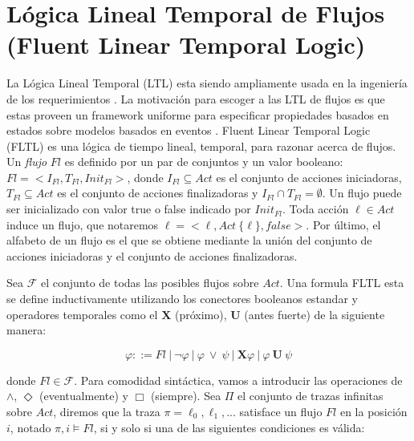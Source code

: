 \section{Lógica Lineal Temporal de Flujos (Fluent Linear Temporal Logic)}

La Lógica Lineal Temporal (LTL) esta siendo ampliamente usada en la ingeniería de los requerimientos
\cite{1347546,Giannakopoulou:2003:FMC:940071.940106,879820,Letier:2002:ATG:581339.581353}. La motivación para escoger a
las LTL de flujos es que estas proveen un framework uniforme para especificar propiedades basados en estados sobre
modelos basados en eventos \cite{Giannakopoulou:2003:FMC:940071.940106}. Fluent Linear Temporal Logic (FLTL) \cite{Giannakopoulou:2003:FMC:940071.940106}
es una lógica de tiempo lineal, temporal, para razonar acerca de flujos. Un \emph{flujo} $Fl$ es definido por un par de
conjuntos y un valor booleano: $Fl = <I_{Fl},T_{Fl},Init_{Fl}>$, donde $I_{Fl} \subseteq Act$ es el conjunto de acciones
iniciadoras, $T_{Fl} \subseteq Act$ es el conjunto de acciones finalizadoras y $I_{Fl} \cap T_{Fl} = \emptyset$. Un
flujo puede ser inicializado con valor true o false indicado por $Init_{Fl}$. Toda acción $\ell \in Act$ induce un flujo,
que notaremos $\ell = <\ell, Act \ \{\ell\}, false>$. Por último, el alfabeto de un flujo es el que se obtiene mediante la
unión del conjunto de acciones iniciadoras y el conjunto de acciones finalizadoras.

Sea $\mathcal{F}$ el conjunto de todas las posibles flujos sobre $Act$. Una formula FLTL esta se define inductivamente
utilizando los conectores booleanos estandar y operadores temporales como el $\mathbf{X}$ (próximo), $\mathbf{U}$ (antes
fuerte) de la
siguiente manera:

\begin{center}
\begin{equation*}
    \varphi ::= Fl\ |\ \neg\varphi\ |\ \varphi\ \lor\ \psi\ |\ \mathbf{X} \varphi\ |\ \varphi\ \mathbf{U}\ \psi
\end{equation*}
\end{center}

\noindent donde $Fl \in \mathcal{F}$. Para comodidad sintáctica, vamos a introducir las operaciones de $\land$,
$\Diamond$ (eventualmente) y $\Box$ (siempre). Sea $\Pi$ el conjunto de trazas infinitas sobre $Act$, diremos que la
traza $\pi = \ell_0,\ell_1,...$ satisface un flujo $Fl$ en la posición $i$, notado $\pi,i\vDash Fl$, si y solo si una de las
siguientes condiciones es válida:

